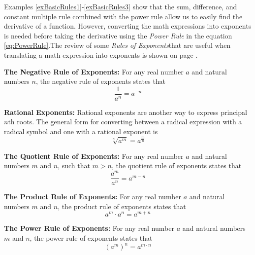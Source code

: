 \noindent Examples \ref{exBasicRules1}-\ref{exBasicRules3} show that the sum, difference, and constant multiple rule combined with the power rule allow us to easily find the derivative of a function. However, converting the math expressions into exponents is needed before taking the derivative using the \emph{Power Rule} in the equation \ref{eq:PowerRule}.The review of some \emph{Rules of Exponents}\footnotemark that are useful when translating a math expression into exponents is shown on page \pageref{eq:quotientRuleExp}.

\newpage

\begin{tcolorbox}[title = {Review: Some Rules of Exponents}]

\textbf{The Negative Rule of Exponents:}
\noindent For any real number $a$ and natural numbers $n$, the negative rule of exponents states that 
\begin{equation}\label{eq:negativeRuleExp}
\frac{1}{a^n}=a^{-n}
\end{equation}

\textbf{Rational Exponents:}
\noindent Rational exponents are another way to express principal $n$th roots. The general form for converting between a radical expression with a radical symbol and one with a rational exponent is
\begin{equation}\label{eq:rationalExp}
\sqrt[n]{a^m}=a^{\frac{m}{n}}
\end{equation}

\textbf{The Quotient Rule of Exponents:}
\noindent For any real number $a$ and natural numbers $m$ and $n$, such that $m>n$,  the quotient rule of exponents states that 
\begin{equation}\label{eq:quotientRuleExp}
\frac{a^m}{a^n}=a^{m-n}
\end{equation}


\textbf{The Product Rule of Exponents:}
\noindent For any real number $a$ and natural numbers $m$ and $n$, the product rule of exponents states that 
\begin{equation}\label{eq:productRuleExp}
a^m\cdot a^n=a^{m+n}
\end{equation}

\textbf{The Power Rule of Exponents:}
\noindent For any real number $a$ and natural numbers $m$ and $n$, the power rule of exponents states that 
\begin{equation}\label{eq:powerRuleExp}
(a^m)^n=a^{m\cdot n}
\end{equation}

\end{tcolorbox}

